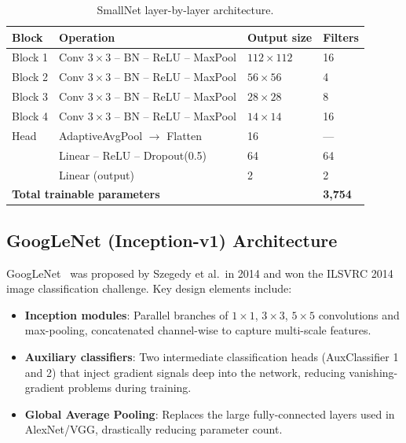 \documentclass[12pt,a4paper]{article}
\begin{document}
\begin{table}[H]
\centering
\caption{SmallNet layer-by-layer architecture.}
\label{tab:smallnet}
\begin{tabular}{llll}
    \toprule
    \textbf{Block} & \textbf{Operation} & \textbf{Output size} & \textbf{Filters} \\
    \midrule
    Block 1 & Conv $3{\times}3$ -- BN -- ReLU -- MaxPool & $112{\times}112$ & 16 \\
    Block 2 & Conv $3{\times}3$ -- BN -- ReLU -- MaxPool & $56{\times}56$   & 4 \\
    Block 3 & Conv $3{\times}3$ -- BN -- ReLU -- MaxPool & $28{\times}28$   & 8 \\
    Block 4 & Conv $3{\times}3$ -- BN -- ReLU -- MaxPool & $14{\times}14$   & 16 \\
    Head    & AdaptiveAvgPool $\rightarrow$ Flatten       & 16               & --- \\
            & Linear -- ReLU -- Dropout(0.5)              & 64               & 64 \\
            & Linear (output)                             & 2                & 2 \\
    \midrule
    \multicolumn{3}{l}{\textbf{Total trainable parameters}} & \textbf{3,754} \\
    \bottomrule
\end{tabular}
\end{table}

\subsection{GoogLeNet (Inception-v1) Architecture}

GoogLeNet~\cite{szegedy2015goingdeeper} was proposed by Szegedy et al.\ in
2014 and won the ILSVRC 2014 image classification challenge.  Key design
elements include:
\begin{itemize}[leftmargin=*]
    \item \textbf{Inception modules}: Parallel branches of $1{\times}1$,
          $3{\times}3$, $5{\times}5$ convolutions and max-pooling, concatenated
          channel-wise to capture multi-scale features.
    \item \textbf{Auxiliary classifiers}: Two intermediate classification heads
          (AuxClassifier 1 and 2) that inject gradient signals deep into the
          network, reducing vanishing-gradient problems during training.
    \item \textbf{Global Average Pooling}: Replaces the large fully-connected
          layers used in AlexNet/VGG, drastically reducing parameter count.
\end{itemize}
\end{document}
